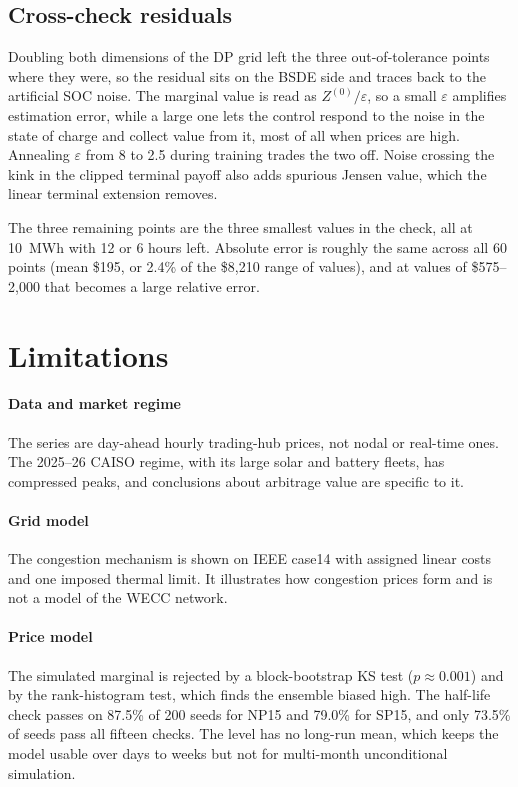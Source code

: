 \documentclass[11pt]{article}
\begin{document}
\subsection{Cross-check residuals}

Doubling both dimensions of the DP grid left the three out-of-tolerance
points where they were, so the residual sits on the BSDE side and traces
back to the artificial SOC noise. The marginal value is read as
$Z^{(0)}/\varepsilon$, so a small $\varepsilon$ amplifies estimation
error, while a large one lets the control respond to the noise in the
state of charge and collect value from it, most of all when prices are
high. Annealing $\varepsilon$ from 8 to 2.5 during training trades the two
off. Noise crossing the kink in the clipped terminal payoff also adds
spurious Jensen value, which the linear terminal extension removes.

The three remaining points are the three smallest values in the check,
all at 10~MWh with 12 or 6 hours left. Absolute error is roughly the same
across all 60 points (mean \$195, or 2.4\% of the \$8{,}210 range of
values), and at values of \$575--2{,}000 that becomes a large relative
error.

\section{Limitations}

\paragraph{Data and market regime}
The series are day-ahead hourly trading-hub prices, not nodal or
real-time ones. The 2025--26 CAISO regime, with its large solar and
battery fleets, has compressed peaks, and conclusions about arbitrage
value are specific to it.

\paragraph{Grid model}
The congestion mechanism is shown on IEEE case14 with assigned linear
costs and one imposed thermal limit. It illustrates how congestion prices
form and is not a model of the WECC network.

\paragraph{Price model}
The simulated marginal is rejected by a block-bootstrap KS test
($p \approx 0.001$) and by the rank-histogram test, which finds the
ensemble biased high. The half-life check passes on 87.5\% of 200 seeds
for NP15 and 79.0\% for SP15, and only 73.5\% of seeds pass all fifteen
checks. The level has no long-run mean, which keeps the model usable over days to weeks but not for
multi-month unconditional simulation.
\end{document}

